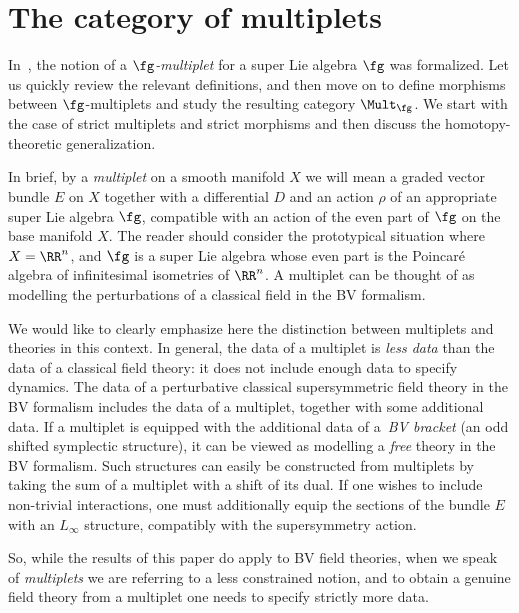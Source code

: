 \section{The category of multiplets} \label{sec: multiplets}
In~\cite{perspectives}, the notion of a \emph{$\fg$-multiplet} for a super Lie algebra $\fg$ was formalized. Let us quickly review the relevant definitions, and then move on to define morphisms between $\fg$-multiplets and study the resulting category $\Mult_{\fg}$. We start with the case of strict multiplets and strict morphisms and then discuss the homotopy-theoretic generalization.

In brief, by a \emph{multiplet} on a smooth manifold $X$ we will mean a graded vector bundle $E$ on $X$ together with a differential $D$ and an action $\rho$ of an appropriate super Lie algebra $\fg$, compatible with an action of the even part of $\fg$ on the base manifold $X$. The reader should consider the prototypical situation where $X = \RR^n$, and $\fg$ is a super Lie algebra whose even part is the Poincar\'e algebra of infinitesimal isometries of $\RR^n$. A multiplet can be thought of as modelling the perturbations of a classical field in the BV formalism.

\begin{rmk}
	We would like to clearly emphasize here the distinction between multiplets and theories in this context. In general, the data of a multiplet is \emph{less data} than the data of a classical field theory: it does not include enough data to specify dynamics. The data of a perturbative classical supersymmetric field theory in the BV formalism includes the data of a multiplet, together with some additional data. If a multiplet is equipped with the additional data of a~\emph{BV bracket} (an odd shifted symplectic structure), it can be viewed as modelling a \emph{free} theory in the BV formalism. Such structures can easily be constructed from multiplets by taking the sum of a multiplet with a shift of its dual.	If one wishes to include non-trivial interactions, one must additionally equip the sections of the bundle $E$ with an $L_\infty$ structure, compatibly with the supersymmetry action.
	
	So, while the results of this paper do apply to BV field theories, when we speak of \emph{multiplets} we are referring to a less constrained notion, and to obtain a genuine field theory from a multiplet one needs to specify strictly more data.
\end{rmk}

